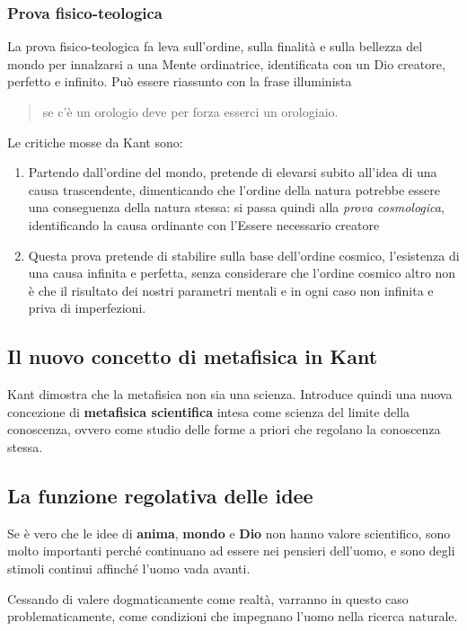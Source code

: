 \documentclass[a4paper, twoside, titlepage]{book}
\newcommand{\citazione}[1]{%
  \begin{quotation}
  #1
  \end{quotation}}
\begin{document}
\subsubsection{Prova fisico-teologica}

La prova fisico-teologica fa leva sull’ordine, sulla finalità e sulla bellezza del mondo per innalzarsi a una Mente ordinatrice, identificata con un Dio creatore, perfetto e infinito. Può essere riassunto con la frase illuminista
\citazione{se c’è un orologio deve per forza esserci un orologiaio.}

Le critiche mosse da Kant sono:
\begin{enumerate}
\item Partendo dall’ordine del mondo, pretende di elevarsi subito all’idea di una causa trascendente, dimenticando che l’ordine della natura potrebbe essere una conseguenza della natura stessa: si passa quindi alla \textit{prova cosmologica}, identificando la causa ordinante con l’Essere necessario creatore
\item Questa prova pretende di stabilire sulla base dell’ordine cosmico, l’esistenza di una causa infinita e perfetta, senza considerare che l’ordine cosmico altro non è che il risultato dei nostri parametri mentali e in ogni caso non infinita e priva di imperfezioni.
\end{enumerate}

\subsection{Il nuovo concetto di metafisica in Kant}

Kant dimostra che la metafisica non sia una scienza. Introduce quindi una nuova concezione di \textbf{metafisica scientifica} intesa come scienza del limite della conoscenza, ovvero come studio delle forme a priori che regolano la conoscenza stessa.

\subsection{La funzione regolativa delle idee}

Se è vero che le idee di \textbf{anima}, \textbf{mondo} e \textbf{Dio} non hanno valore scientifico, sono molto importanti perché continuano ad essere nei pensieri dell’uomo, e sono degli stimoli continui affinché l’uomo vada avanti.

Cessando di valere dogmaticamente come realtà, varranno in questo caso problematicamente, come condizioni che impegnano l’uomo nella ricerca naturale.
\end{document}
